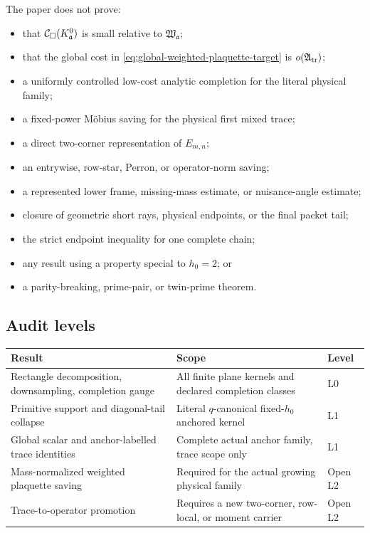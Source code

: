 The paper does not prove:
\begin{itemize}
 \item that \(\mathcal C_\square(K_{\mathfrak a}^{0})\) is small relative to
       \(\mathfrak W_{\mathfrak a}\);
 \item that the global cost in
       \eqref{eq:global-weighted-plaquette-target} is
       \(o(\mathfrak A_{\rm tr})\);
 \item a uniformly controlled low-cost analytic completion for the literal
       physical family;
 \item a fixed-power M\"obius saving for the physical first mixed trace;
 \item a direct two-corner representation of \(E_{m,n}\);
 \item an entrywise, row-star, Perron, or operator-norm saving;
 \item a represented lower frame, missing-mass estimate, or nuisance-angle
       estimate;
 \item closure of geometric short rays, physical endpoints, or the final
       packet tail;
 \item the strict endpoint inequality for one complete chain;
 \item any result using a property special to \(h_0=2\); or
 \item a parity-breaking, prime-pair, or twin-prime theorem.
\end{itemize}

\subsection{Audit levels}

\begin{center}
\begin{tabular}{@{}
 >{\raggedright\arraybackslash}p{}
 >{\raggedright\arraybackslash}p{}
 >{\raggedright\arraybackslash}p{}@{}}
\toprule
Result & Scope & Level\\
\midrule
Rectangle decomposition, downsampling, completion gauge &
All finite plane kernels and declared completion classes &
L0\\
Primitive support and diagonal-tail collapse &
Literal \(q\)-canonical fixed-\(h_0\) anchored kernel &
L1\\
Global scalar and anchor-labelled trace identities &
Complete actual anchor family, trace scope only &
L1\\
Mass-normalized weighted plaquette saving &
Required for the actual growing physical family &
Open L2\\
Trace-to-operator promotion &
Requires a new two-corner, row-local, or moment carrier &
Open L2\\
\bottomrule
\end{tabular}
\end{center}

